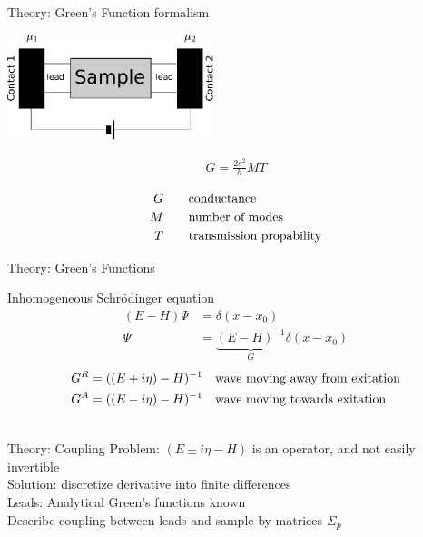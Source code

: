 \documentclass{beamer}
\begin{document}
\begin{frame}{Theory: Green's Function formalism}
    \begin{multicols}{2}
        \includegraphics[width=6cm]{sample-leads}

        \begin{align*}
            G = \frac{2 e^2}{h} MT
        \end{align*}

        \begin{align*}
            G \qquad& \textnormal{conductance}\\
            M \qquad& \textnormal{number of modes}\\
            T \qquad& \textnormal{transmission propability}
        \end{align*}
    \end{multicols}
\end{frame}

\begin{frame}{Theory: Green's Functions}
    \begin{center}
        Inhomogeneous Schrödinger equation
        \begin{align*}
            (E-H) \Psi &= \delta(x-x_0)\\
            \Psi       &= \underbrace{(E-H)^{-1}}_{G} \delta(x-x_0)
        \end{align*}
        \pause
        \begin{align*}
            G^R = ((E + i \eta) -H)^{-1}\quad & \textnormal{wave moving away from exitation}\\
            G^A = ((E - i \eta) -H)^{-1}\quad & \textnormal{wave moving
            towards exitation}
        \end{align*}

        \begin{align*}
        \end{align*}
   \end{center}
\end{frame}

\begin{frame}{Theory: Coupling}
    Problem: $(E\pm i\eta-H)$ is an operator, and not easily invertible\\[1em]

    \pause
    Solution: discretize derivative into finite differences\\[1em]

    \pause
    Leads: Analytical Green's functions known\\[1em]

    \pause
    Describe coupling between leads and sample by matrices $\Sigma_p$
\end{frame}
\end{document}
